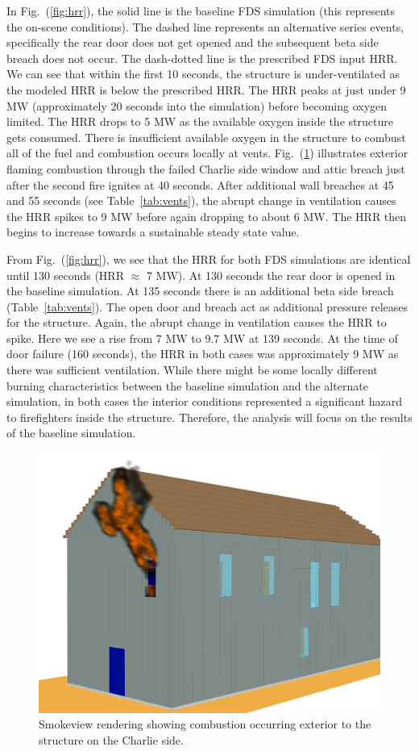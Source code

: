 \documentclass[11pt,oneside]{book}
\begin{document}
In Fig.~(\ref{fig:hrr}), the solid line is the baseline FDS simulation (this represents the on-scene conditions). The dashed line represents an alternative series events, specifically the rear door does not get opened and the subsequent beta side breach does not occur. The dash-dotted line is the prescribed FDS input HRR. We can see that within the first 10 seconds, the structure is under-ventilated as the modeled HRR is below the prescribed HRR. The HRR peaks at just under 9 MW (approximately 20 seconds into the simulation) before becoming oxygen limited. The HRR drops to 5 MW as the available oxygen inside the structure gets consumed. There is insufficient available oxygen in the structure to combust all of the fuel and combustion occurs locally at vents. Fig.~(\ref{fig:smv_ext_fire}) illustrates exterior flaming combustion through the failed Charlie side window and attic breach just after the second fire ignites at 40 seconds. After additional wall breaches at 45 and 55 seconds (see Table~\ref{tab:vents}), the abrupt change in ventilation causes the HRR spikes to 9 MW before again dropping to about 6 MW. The HRR then begins to increase towards a sustainable steady state value.

From Fig.~(\ref{fig:hrr}), we see that the HRR for both FDS simulations are identical until 130 seconds (HRR $\approx$ 7 MW). At 130 seconds the rear door is opened in the baseline simulation. At 135 seconds there is an additional beta side breach (Table~\ref{tab:vents}). The open door and breach act as additional pressure releases for the structure. Again, the abrupt change in ventilation causes the HRR to spike. Here we see a rise from 7 MW to 9.7 MW at 139 seconds. At the time of door failure (160 seconds), the HRR in both cases was approximately 9 MW as there was sufficient ventilation. While there might be some locally different burning characteristics between the baseline simulation and the alternate simulation, in both cases the interior conditions represented a significant hazard to firefighters inside the structure. Therefore, the analysis will focus on the results of the baseline simulation.

\begin{figure}[h!]
\centering
\includegraphics[width=.675\textwidth]{../Figures/smv_exterior_fire}
\caption{Smokeview rendering showing combustion occurring exterior to the structure on the Charlie side.}
\label{fig:smv_ext_fire}
\end{figure}
\end{document}
